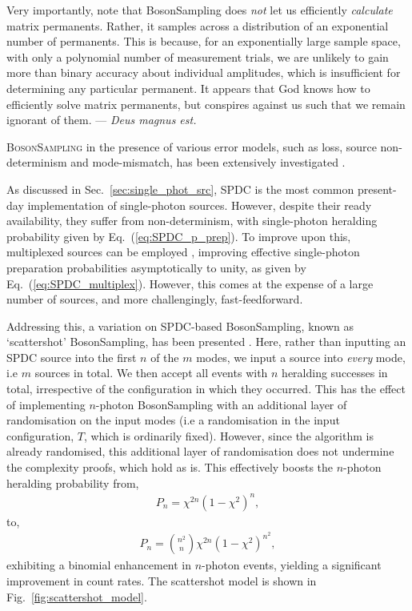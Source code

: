 \documentclass[aps,rmp,twocolumn,amsmath,amssymb,nofootinbib,superscriptaddress,longbibliography,floatfix,table-of-contents,eqsecnum]{revtex4-1}
\begin{document}
Very importantly, note that {\sc BosonSampling} does \textit{not} let us efficiently \textit{calculate} matrix permanents. Rather, it samples across a distribution of an exponential number of permanents. This is because, for an exponentially large sample space, with only a polynomial number of measurement trials, we are unlikely to gain more than binary accuracy about individual amplitudes, which is insufficient for determining any particular permanent. It appears that God knows how to efficiently solve matrix permanents, but conspires against us such that we remain ignorant of them. --- \textit{Deus magnus est.}

\textsc{BosonSampling} in the presence of various error models, such as loss, source non-determinism and mode-mismatch, has been extensively investigated \cite{bib:RohdeErrBS12, bib:RohdeSPDC13, bib:ScottLost16, bib:RohdeArbSpec15, bib:RandBS}. 

As discussed in Sec.~\ref{sec:single_phot_src}, SPDC is the most common present-day implementation of single-photon sources. However, despite their ready availability, they suffer from non-determinism, with single-photon heralding probability given by Eq.~(\ref{eq:SPDC_p_prep}). To improve upon this, multiplexed sources can be employed \cite{bib:RohdeSPDC13}, improving effective single-photon preparation probabilities asymptotically to unity, as given by Eq.~(\ref{eq:SPDC_multiplex}). However, this comes at the expense of a large number of sources, and more challengingly, fast-feedforward.

Addressing this, a variation on SPDC-based {\sc BosonSampling}, known as `scattershot' {\sc BosonSampling}, has been presented \cite{bib:RandBS}. Here, rather than inputting an SPDC source into the first $n$ of the $m$ modes, we input a source into \textit{every} mode, i.e $m$ sources in total. We then accept all events with $n$ heralding successes in total, irrespective of the configuration in which they occurred. This has the effect of implementing $n$-photon {\sc BosonSampling} with an additional layer of randomisation on the input modes (i.e a randomisation in the input configuration, $T$, which is ordinarily fixed). However, since the algorithm is already randomised, this additional layer of randomisation does not undermine the complexity proofs, which hold as is. This effectively boosts the $n$-photon heralding probability from,
\begin{align}
P_n = \chi^{2n}(1-\chi^2)^n,	
\end{align}
to,
\begin{align}
P_n = \binom{n^2}{n}\chi^{2n}(1-\chi^2)^{n^2},	
\end{align}
exhibiting a binomial enhancement in $n$-photon events, yielding a significant improvement in count rates. The scattershot model is shown in Fig.~\ref{fig:scattershot_model}.
\end{document}
